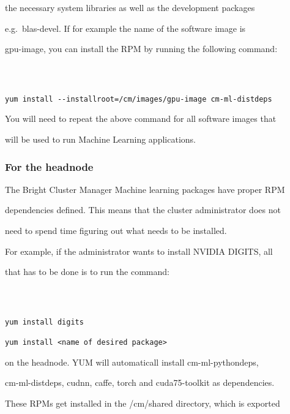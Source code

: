 \documentclass[]{article}
\begin{document}
the necessary system libraries as well as the development packages

e.g.~blas-devel. If for example the name of the software image is

gpu-image, you can install the RPM by running the following command:



\begin{verbatim}



yum install --installroot=/cm/images/gpu-image cm-ml-distdeps

\end{verbatim}



You will need to repeat the above command for all software images that

will be used to run Machine Learning applications.



\subsubsection{For the headnode}\label{for-the-headnode}



The Bright Cluster Manager Machine learning packages have proper RPM

dependencies defined. This means that the cluster administrator does not

need to spend time figuring out what needs to be installed.



For example, if the administrator wants to install NVIDIA DIGITS, all

that has to be done is to run the command:



\begin{verbatim}



yum install digits

yum install <name of desired package>

\end{verbatim}



on the headnode. YUM will automaticall install cm-ml-pythondeps,

cm-ml-distdeps, cudnn, caffe, torch and cuda75-toolkit as dependencies.

These RPMs get installed in the /cm/shared directory, which is exported
\end{document}
